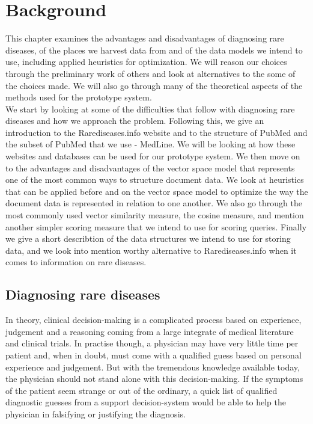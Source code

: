 \chapter{Background\label{Background}}

This chapter examines the advantages and disadvantages of diagnosing
rare diseases, of the places we harvest data from and of the data
models we intend to use, including applied heuristics for
optimization. We will reason our choices through the preliminary work
of others and look at alternatives to the some of the choices made. We
will also go through many of the theoretical aspects of the methods
used for the prototype system.\\

We start by looking at some of the difficulties that follow with
diagnosing rare diseases and how we approach the problem. Following
this, we give an introduction to the Rarediseases.info website and to
the structure of PubMed and the subset of PubMed that we use -
MedLine. We will be looking at how these websites and databases can be
used for our prototype system. We then move on to the advantages and
disadvantages of the vector space model that represents one of the
most common ways to structure document data. We look at heuristics
that can be applied before and on the vector space model to optimize
the way the document data is represented in relation to one
another. We also go through the most commonly used vector similarity
measure, the cosine measure, and mention another simpler scoring
measure that we intend to use for scoring queries. Finally we give a
short describtion of the data structures we intend to use for storing
data, and we look into mention worthy alternative to Rarediseases.info
when it comes to information on rare diseases.

\section{Diagnosing rare diseases}

In theory, clinical decision-making is a complicated process based on
experience, judgement and a reasoning coming from a large integrate of
medical literature and clinical trials. In practise though, a
physician may have very little time per patient and, when in doubt,
must come with a qualified guess based on personal experience and
judgement. But with the tremendous knowledge available today, the
physician should not stand alone with this decision-making. If the
symptoms of the patient seem strange or out of the ordinary, a quick
list of qualified diagnostic guesses from a support decision-system
would be able to help the physician in falsifying or justifying the
diagnosis.\\

